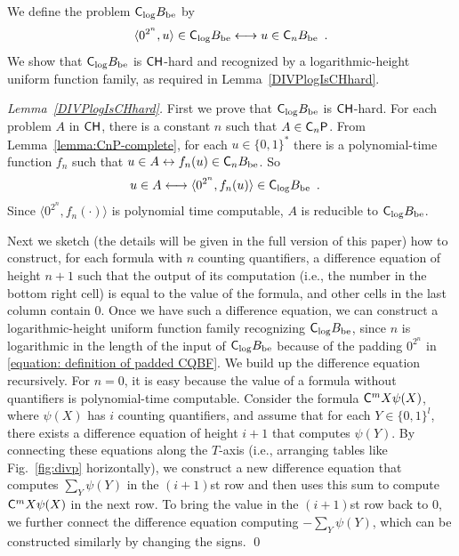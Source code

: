 We define the problem $\mathsf{C}_{\log} B_{\mathrm{be}}$ by
\begin{equation}
\label{equation: definition of padded CQBF}
 \langle 0^{2^n}, u \rangle \in \mathsf{C}_{\log} B_{\mathrm{be}}
 \longleftrightarrow
 u \in \mathsf{C}_n B_{\mathrm{be}} \enspace .
\end{equation}
We show that $\mathsf{C}_{\log} B_{\mathrm{be}}$ 
is $\mathsf{CH}$-hard and recognized by a logarithmic-height uniform function family,
as required in Lemma~\ref{DIVPlogIsCHhard}. 

\begin{proof}[Lemma~\ref{DIVPlogIsCHhard}]
First we prove that $\mathsf{C}_{\log} B_{\mathrm{be}}$ is $\mathsf{CH}$-hard.
For each problem $A$ in $\mathsf{CH}$, there is a constant $n$ such that $A \in \mathsf{C}_n \mathsf{P}$.
From Lemma~\ref{lemma:CnP-complete}, for each $u \in \{0,1\}^*$
there is a polynomial-time function $f_n$ such that
$u \in A \leftrightarrow f_n(u) \in \mathsf{C}_n B_{\mathrm{be}}$. So
\begin{align}
 u \in A 
 & \longleftrightarrow \langle 0^{2^n}, f_n(u) \rangle \in \mathsf{C}_{\log} B_{\mathrm{be}} \enspace .
\end{align}
Since $\langle 0^{2^n}, f_n(\cdot) \rangle$ is polynomial time computable,
$A$ is reducible to $\mathsf{C}_{\log} B_{\mathrm{be}}$.

Next we sketch 
(the details will be given in the full version of this paper) 
how to construct, 
for each formula with $n$ counting quantifiers, 
a difference equation of height $n+1$ 
such that 
the output of its computation (i.e., the number in the bottom right cell)
is equal to the value of the formula, 
and other cells in the last column contain $0$.
Once we have such a difference equation, 
we can construct a logarithmic-height uniform function family
recognizing $\mathsf{C}_{\log} B_{\mathrm{be}}$, 
since 
$n$ is logarithmic in the length of the input of $\mathsf{C}_{\log} B_{\mathrm{be}}$
because of the padding $0^{2^n}$
in \eqref{equation: definition of padded CQBF}. 
We build up the difference equation recursively.
For $n = 0$, it is easy because
the value of a formula without quantifiers is
polynomial-time computable.
Consider the formula $\mathsf{C}^m X \psi(X)$, 
where $\psi(X)$ has $i$ counting quantifiers, 
and assume that for each $Y \in \{0, 1\} ^l$, 
there exists a difference equation of height $i+1$
that computes $\psi(Y)$.
By connecting these equations along the $T$-axis
(i.e., arranging tables like Fig.~\ref{fig:divp} horizontally), 
we construct a new difference equation
that computes $\sum_Y \psi(Y)$ in the $(i+1)$st row
and then uses this sum to compute $\mathsf{C}^m X \psi(X)$ in the next row. 
To bring the value in the $(i+1)$st row back to $0$, 
we further connect the difference equation 
computing $-\sum_Y \psi(Y)$, 
which can be constructed similarly by changing the signs. 
\qed
\end{proof}


